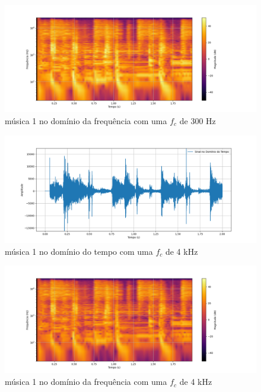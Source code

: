 \begin{anexosenv}
\begin{figure}[h]
	\centering
    \includegraphics[width=\textwidth]{figuras/fig29.png}
	\caption{música 1 no domínio da frequência com uma $f_c$ de 300 Hz}
	\label{fig29}
\end{figure}

\begin{figure}[h]
	\centering
    \includegraphics[width=\textwidth]{figuras/fig26.png}
	\caption{música 1 no domínio do tempo com uma $f_c$ de 4 kHz}
	\label{fig26}
\end{figure}

\begin{figure}[h]
	\centering
    \includegraphics[width=\textwidth]{figuras/fig27.png}
	\caption{música 1 no domínio da frequência com uma $f_c$ de 4 kHz}
	\label{fig27}
\end{figure}


\end{anexosenv}
